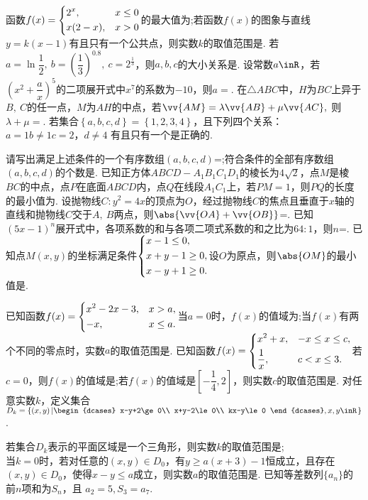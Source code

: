\documentclass{BHCexam}
\begin{document}
\begin{questions}
		
		\qs 函数$f(x)=\begin{dcases}
			2^x,&x\le0\\
			x(2-x),&x>0
		\end{dcases}$的最大值为\tk;若函数$f(x)$的图象与直线$ y=k(x-1) $有且只有一个公共点，则实数$ k $的取值范围是\tk.
		\qs 若$ a=\ln\dfrac{1}{2},\ b=\left(\dfrac{1}{3}\right)^{0.8},\ c=2^{\frac{1}{3}} $，则$ a,b,c $的大小关系是\tk.
		\qs 设常数$ a\inR $，若$ \left(x^2+\dfrac{a}{x}\right)^5 $的二项展开式中$ x^7 $的系数为$ -10 $，则$ a= $\tk.
		\qs 在$\triangle ABC$中，$ H $为$ BC $上异于$ B,\ C $的任一点，$ M $为$ AH $的中点，若$ \vv{AM}=\lambda\vv{AB}+\mu\vv{AC},\  $则$ \lambda+\mu =$\tk.
		\qs 若集合$ \left\{a,b,c,d\right\} =\left\{1,2,3,4\right\}$，且下列四个关系：\\
		$ a=1 $\qquad {}$b\ne1$\qquad{}$c=2$，\qquad{}$d\ne4$
		有且只有一个是正确的.\par
		请写出满足上述条件的一个有序数组$ \left(a,b,c,d\right) $=\tk;符合条件的全部有序数组$ \left(a,b,c,d\right) $的个数是\tk.
		\qs 已知正方体$ABCD-A_1B_1C_1D_1$的棱长为$ 4\sqrt{2} $，点$ M $是棱$ BC $的中点，点$ P $在底面$ ABCD $内，点$ Q $在线段$ A_1C_1 $上，若$ PM=1 $，则$ PQ $的长度的最小值为\tk.
		\qs 设抛物线$ C:y^2=4x $的顶点为$ O $，经过抛物线$ C $的焦点且垂直于$x$轴的直线和抛物线$ C $交于$ A,~B $两点，则$ \abs{\vv{OA}+\vv{OB}} $=\tk.
		\qs 已知$ \left(5x-1\right)^n $展开式中，各项系数的和与各项二项式系数的和之比为$ 64:1 $，则$ n $=\tk.
		\qs 已知点$ M\left(x,y\right) $的坐标满足条件$\begin{dcases}
		x-1\le 0,\\
		x+y-1\ge 0,\\
		x-y+1\ge 0.
		\end{dcases}$设$ O $为原点，则$ \abs{OM} $的最小值是\tk.
		
		\qs 已知函数$f(x)=\begin{dcases}
		x^2-2x-3,&x>a,\\
		-x,&x\le a.
		\end{dcases}$当$ a=0 $时，$f(x)$的值域为\tk;当$f(x)$有两个不同的零点时，实数$ a $的取值范围是\tk.
		\qs 已知函数$f(x)=\begin{dcases}
		x^2+x,&-x\le x\le c,\\
		\dfrac{1}{x},&c<x\le 3.
		\end{dcases}$若$ c=0 $，则$f(x)$的值域是\tk;若$f(x)$的值域是$ \left[-\dfrac{1}{4},2\right] $，则实数$ c $的取值范围是\tk.
		\qs 对任意实数$ k $，定义集合$ D_k=\left\{\left(x,y\right)\left|\begin{dcases}
		x-y+2\ge0\\
		x+y-2\le 0\\
		kx-y\le0 	
		\end{dcases},x,y\inR
		\right.\right\} $.\par 
		若集合$ D_k $表示的平面区域是一个三角形，则实数$ k $的取值范围是\tk;\\
		当$ k=0 $时，若对任意的$ \left(x,y\right)\in D_0 $，有$ y\ge a(x+3)-1 $恒成立，且存在$ \left(x,y\right)\in D_0 $，使得$ x-y\le a $成立，则实数$ a $的取值范围是\tk.
		\clearpage
		\qs 已知等差数列$\{a_n\}$的前$n$项和为$S_n$，且 $a_2=5,S_3=a_7 $.
		\begin{parts}

\end{parts}
\end{questions}
\end{document}
